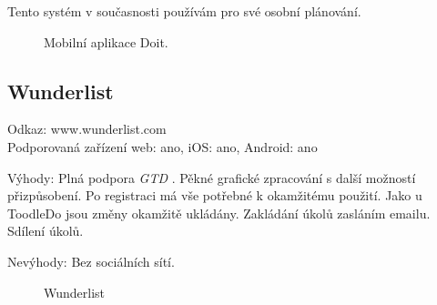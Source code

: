 \documentclass[thesis=B,czech]{FITthesis}[2012/06/26]
\newcommand{\GTD}{\textit{GTD }}
\begin{document}
Tento systém v současnosti používám pro své osobní plánování.

\begin{figure}[h]
	\caption{Mobilní aplikace Doit.\cite{doit_overviewgram}}\label{fig:doit_overviewgram}
\end{figure}

\newpage

\subsection{Wunderlist}

Odkaz: www.wunderlist.com\\
Podporovaná zařízení web: ano, iOS: ano, Android: ano

Výhody:
Plná podpora \GTD. Pěkné grafické zpracování s další možností přizpůsobení. Po registraci má vše potřebné k okamžitému použití. Jako u ToodleDo jsou změny okamžitě ukládány. Zakládání úkolů zasláním emailu. Sdílení úkolů.

Nevýhody:
Bez sociálních sítí. 


\begin{figure}[h]
	\caption{Wunderlist \cite{wunderlist_overview}}\label{fig:wunderlist_overview}
\end{figure}
\end{document}

